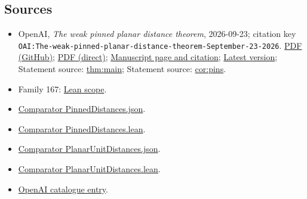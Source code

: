 \documentclass[11pt]{article}
\begin{document}
\subsection{Sources}
\begin{itemize}
\item OpenAI, \emph{The weak pinned planar distance theorem}, 2026-09-23; citation key \texttt{OAI:The-weak-pinned-planar-distance-theorem-September-23-2026}. \href{https://github.com/openai/math/blob/adc7f1241b42e322a6451854ab7e4b4c146bf78a/preprints/The-weak-pinned-planar-distance-theorem-September-23-2026/paper.pdf}{PDF (GitHub)}; \href{https://github.com/openai/math/raw/adc7f1241b42e322a6451854ab7e4b4c146bf78a/preprints/The-weak-pinned-planar-distance-theorem-September-23-2026/paper.pdf}{PDF (direct)}; \href{https://github.com/openai/math/blob/adc7f1241b42e322a6451854ab7e4b4c146bf78a/preprints/The-weak-pinned-planar-distance-theorem-September-23-2026/README.md}{Manuscript page and citation}; \href{https://github.com/openai/math/blob/main/preprints/The-weak-pinned-planar-distance-theorem-September-23-2026/paper.pdf}{Latest version}; Statement source: \href{https://github.com/openai/math/blob/adc7f1241b42e322a6451854ab7e4b4c146bf78a/preprints/The-weak-pinned-planar-distance-theorem-September-23-2026/build/sections/introduction.tex\#L30}{thm:main}; Statement source: \href{https://github.com/openai/math/blob/adc7f1241b42e322a6451854ab7e4b4c146bf78a/preprints/The-weak-pinned-planar-distance-theorem-September-23-2026/build/sections/introduction.tex\#L39}{cor:pins}.
\item Family 167: \href{https://github.com/openai/math/blob/adc7f1241b42e322a6451854ab7e4b4c146bf78a/lean/docs/167.md}{Lean scope}.
\item \href{https://github.com/openai/math/blob/adc7f1241b42e322a6451854ab7e4b4c146bf78a/lean/ComparatorChallenges/PinnedDistances.json}{Comparator PinnedDistances.json}.
\item \href{https://github.com/openai/math/blob/adc7f1241b42e322a6451854ab7e4b4c146bf78a/lean/ComparatorChallenges/PinnedDistances.lean}{Comparator PinnedDistances.lean}.
\item \href{https://github.com/openai/math/blob/adc7f1241b42e322a6451854ab7e4b4c146bf78a/lean/ComparatorChallenges/PlanarUnitDistances.json}{Comparator PlanarUnitDistances.json}.
\item \href{https://github.com/openai/math/blob/adc7f1241b42e322a6451854ab7e4b4c146bf78a/lean/ComparatorChallenges/PlanarUnitDistances.lean}{Comparator PlanarUnitDistances.lean}.
\item \href{https://github.com/openai/math/blob/adc7f1241b42e322a6451854ab7e4b4c146bf78a/CONTENTS.md}{OpenAI catalogue entry}.
\end{itemize}
\end{document}
